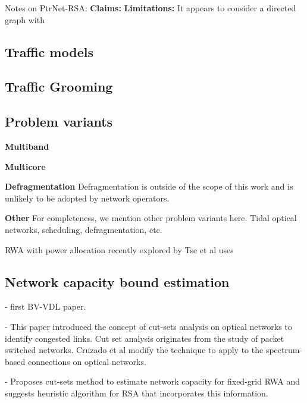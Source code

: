 Notes on PtrNet-RSA:
\textbf{Claims:} 
\textbf{Limitations:} It appears to consider a directed graph with 


\subsection{Traffic models}
\label{sec:survey-traffic_models}

\subsection{Traffic Grooming}
\label{sec:survey-grooming}


\subsection{Problem variants}
\label{sec:survey-problem_variants}
 
\textbf{Multiband}

\textbf{Multicore}

\textbf{Defragmentation} Defragmentation is outside of the scope of this work and is unlikely to be adopted by network operators.

\textbf{Other} For completeness, we mention other problem variants here. Tidal optical networks, scheduling, defragmentation, etc.

RWA with power allocation recently explored by Tse et al \cite{tse_reinforcement_2024} uses 



\subsection{Network capacity bound estimation}
\label{sec:survey-capacity_bounds}


\cite{hayashi_efficient_2022} - first BV-VDL paper.

\cite{hayashi_cost-effective_2023} - This paper introduced the concept of cut-sets analysis on optical networks to identify congested links. Cut set analysis originates from the study of packet switched networks. Cruzado et al modify the technique to apply to the spectrum-based connections on optical networks.

\cite{cruzado_effective_2023} - Proposes cut-sets method to estimate network capacity for fixed-grid RWA and suggests heuristic algorithm for RSA that incorporates this information.

